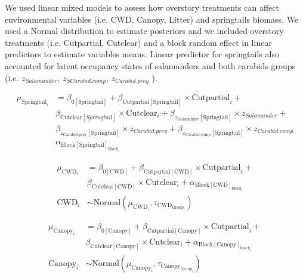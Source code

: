 We used linear mixed models to assess how overstory treatments can affect environmental variables (i.e. CWD, Canopy, Litter) and springtails biomass. 
We used a Normal distribution to estimate posteriors and we included overstory treatments (i.e. Cutpartial, Cutclear) and a block random effect in linear predictors 
to estimate variables means. Linear predictor for springtails also accounted for latent occupancy states of salamanders and both carabids groups (i.e. $z_{Salamander}$, $z_{SCarabid.comp}$, $z_{Carabid.prey}$ ).

\vspace{0.5cm}

\begin{align}
  \mu_{\text{Springtail}_i} &=
  \beta_{0[\text{Springtail}]} + \beta_{\text{Cutpartial}[\text{Springtail}]} \times \text{Cutpartial}_i + \nonumber\\
  &\beta_{\text{Cutclear}[Springtail]} \times \text{Cutclear}_i + \beta_{z_{\text{Salamander}}[\text{Springtail}]} \times z_{Salamander} + \\
  &\beta_{z_{\text{Carabid.prey}}[\text{Springtail}]} \times z_{Carabid.prey} + \beta_{z_{\text{Carabid.comp}}[\text{Springtail}]} \times z_{Carabid.comp} \nonumber\\
  &\alpha_{\text{Block}[\text{Springtail}]_{\text{Block}_i}} \nonumber
\end{align}

\begin{align}
  \mu_{\text{CWD}_i} &= 
  \beta_{0[\text{CWD}]} + \beta_{\text{Cutpartial}[\text{CWD}]} \times \text{Cutpartial}_{i} + \nonumber\\
  & \beta_{\text{Cutclear}[\text{CWD}]} \times \text{Cutclear}_{i} + \alpha_{\text{Block}[\text{CWD}]_{\text{block}_i}} \\
  \text{CWD}_{i} &\sim 
  \text{Normal} (\mu_{\text{CWD}_i}, \tau_{\text{CWD}_{\text{Group}_i}}) \nonumber 
\end{align}


\begin{align}
  \mu_{\text{Canopy}_i} &= 
  \beta_{0[\text{Canopy}]} + \beta_{\text{Cutpartial}[\text{Canopy}]} \times \text{Cutpartial}_{i} + \nonumber \\
  & \beta_{\text{Cutclear}[\text{Canopy}]} \times \text{Cutclear}_{i} + \alpha_{\text{Block}[\text{Canopy}]_{\text{block}_i}} \\
  \text{Canopy}_{i} &\sim 
  \text{Normal} (\mu_{\text{Canopy}_i}, \tau_{\text{Canopy}_{\text{Group}_i}}) \nonumber 
\end{align}

